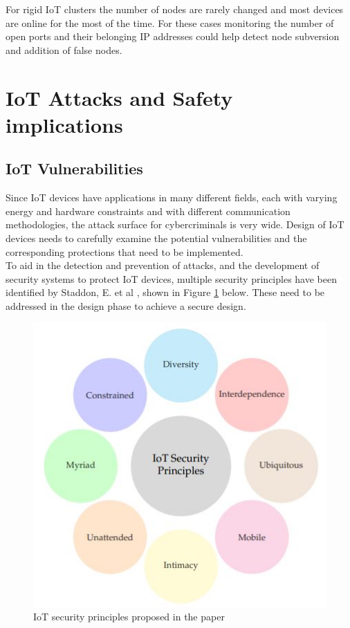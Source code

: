 For rigid IoT clusters the number of nodes are rarely changed and most devices are online for the most of the time. For these cases monitoring the number of open ports and their belonging IP addresses could help detect node subversion and addition of false nodes. 













\section{IoT Attacks and Safety implications}

\subsection{IoT Vulnerabilities}
Since IoT devices have applications in many different fields, each with varying energy and hardware constraints and with different communication methodologies, the attack surface for cybercriminals is very wide. Design of IoT devices needs to carefully examine the potential vulnerabilities and the corresponding protections that need to be implemented.\\
    
To aid in the detection and prevention of attacks, and the development of security systems to protect IoT devices, multiple security principles have been identified by Staddon, E. et al \cite{IoT_categorization}, shown in Figure \ref{fig:security_principles} below. These need to be addressed in the design phase to achieve a secure design.\\

\begin{figure}[h]
    \centering
    \includegraphics[width=.8\linewidth]{images/IoT security principles.JPG}
    \caption{IoT security principles proposed in the paper}
    \label{fig:security_principles}
\end{figure}

